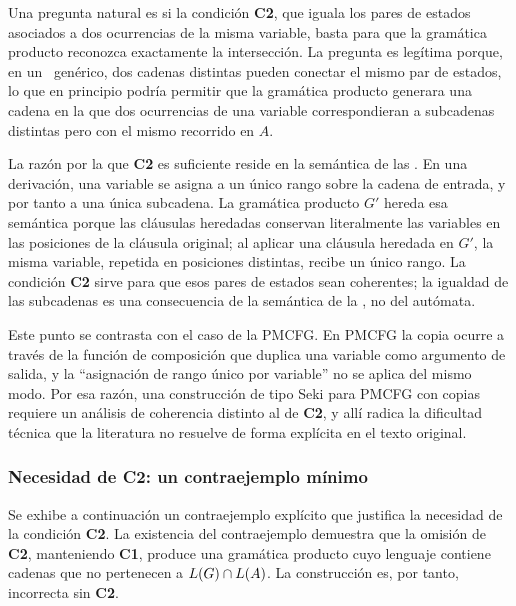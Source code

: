 Una pregunta natural es si la condición \textbf{C2}, que iguala los pares de estados asociados a dos ocurrencias de la misma variable, basta para que la gramática producto reconozca exactamente la intersección. La pregunta es legítima porque, en un \AFD\ genérico, dos cadenas distintas pueden conectar el mismo par de estados, lo que en principio podría permitir que la gramática producto generara una cadena en la que dos ocurrencias de una variable correspondieran a subcadenas distintas pero con el mismo recorrido en $A$.

La razón por la que \textbf{C2} es suficiente reside en la semántica de las \PRCG. En una derivación, una variable se asigna a un único rango sobre la cadena de entrada, y por tanto a una única subcadena. La gramática producto $G'$ hereda esa semántica porque las cláusulas heredadas conservan literalmente las variables en las posiciones de la cláusula original; al aplicar una cláusula heredada en $G'$, la misma variable, repetida en posiciones distintas, recibe un único rango. La condición \textbf{C2} sirve para que esos pares de estados sean coherentes; la igualdad de las subcadenas es una consecuencia de la semántica de la \PRCG, no del autómata.

Este punto se contrasta con el caso de la PMCFG. En PMCFG la copia ocurre a través de la función de composición que duplica una variable como argumento de salida, y la ``asignación de rango único por variable'' no se aplica del mismo modo. Por esa razón, una construcción de tipo Seki para PMCFG con copias requiere un análisis de coherencia distinto al de \textbf{C2}, y allí radica la dificultad técnica que la literatura no resuelve de forma explícita en el texto original.

\subsubsection{Necesidad de \texorpdfstring{\textbf{C2}}{C2}: un contraejemplo mínimo}\label{sec:contraejemplo-c2}

Se exhibe a continuación un contraejemplo explícito que justifica la necesidad de la condición \textbf{C2}. La existencia del contraejemplo demuestra que la omisión de \textbf{C2}, manteniendo \textbf{C1}, produce una gramática producto cuyo lenguaje contiene cadenas que no pertenecen a $L(G) \cap L(A)$. La construcción es, por tanto, incorrecta sin \textbf{C2}.

